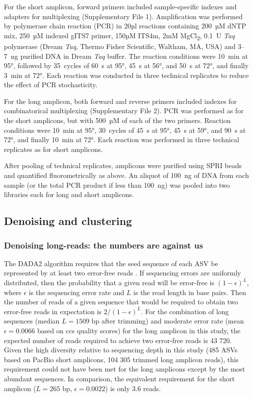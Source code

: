 \documentclass[
]{article}
\begin{document}
For the short amplicon, forward primers included sample-specific indexes and adapters for multiplexing (Supplementary File 1).
Amplification was performed by polymerase chain reaction (PCR) in 20µl reactions containing 200~µM dNTP mix, 250~µM indexed gITS7 primer,
150µM ITS4m, 2mM MgCl\textsubscript{2}, 0.1~U \emph{Taq} polymerase (Dream \emph{Taq}, Thermo Fisher Scientific, Waltham, MA, USA) and 3--7~ng purified DNA in Dream \emph{Taq} buffer.
The reaction conditions were 10~min at 95°, followed by 35~cycles of 60~s at 95°, 45~s at 56°, and 50~s at 72°, and finally 3~min at 72°.
Each reaction was conducted in three technical replicates to reduce the effect of PCR stochasticity.

For the long amplicon, both forward and reverse primers included indexes for combinatorical multiplexing (Supplementary File 2).
PCR was performed as for the short amplicons, but with 500~µM of each of the two primers.
Reaction conditions were 10~min at 95°, 30~cycles of 45~s at 95°, 45~s at 59°, and 90~s at 72°, and finally 10~min at 72°.
Each reaction was performed in three technical replicates as for short amplicons.

After pooling of technical replicates, amplicons were purified using SPRI beads \autocite{vesterinen2016} and quantified fluorometrically as above.
An aliquot of 100~ng of DNA from each sample (or the total PCR product if less than 100~ng) was pooled into two libraries each for long and short amplicons.

\hypertarget{denoising-supplement}{%
\subsection{Denoising and clustering}\label{denoising-supplement}}

\hypertarget{long-numbers}{%
\subsubsection{Denoising long-reads: the numbers are against us}\label{long-numbers}}

The DADA2 algorithm requires that the seed sequence of each ASV be represented by at least two error-free reads \autocite{callahan2016}.
If sequencing errors are uniformly distributed, then the probability that a given read will be error-free is \((1-\epsilon)^L\), where \(\epsilon\) is the sequencing error rate and \(L\) is the read length in base pairs.
Then the number of reads of a given sequence that would be required to obtain two error-free reads in expectation is \(2/(1-\epsilon)^L\).
For the combination of long sequences (median \(L=1509 \text{ bp}\) after trimming) and moderate error rate (mean \(\epsilon= 0.0066\) based on ccs quality scores) for the long amplicon in this study, the expected number of reads required to achieve two error-free reads is 43 720.
Given the high diversity relative to sequencing depth in this study (485 ASVs based on PacBio short amplicons, 104 305 trimmed long amplicon reads), this requirement could not have been met for the long amplicons except by the most abundant sequences.
In comparison, the equivalent requirement for the short amplicon (\(L=265 \text{ bp}\), \(\epsilon=0.0022\)) is only 3.6 reads.
\end{document}
